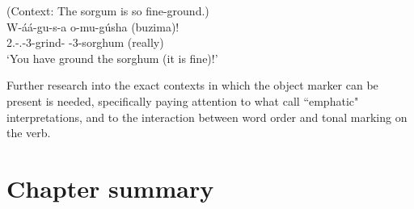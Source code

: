 \documentclass[output=paper]{langscibook}
\begin{document}
\z

\ea
\label{bkm:Ref114323509}
(Context: The sorgum is so fine-ground.)\\
\gll
W-áá-gu-s-a  o-mu-gúsha  (buzima)!\\
2\SG{}.\SM{}-\N{}.\PST{}-3\OM{}-{}grind-\FV{}  \AUG{}-{}3-sorghum  (really)\\
\glt
‘You have ground the sorghum (it is fine)!’\\


\z

Further research into the exact contexts in which the object marker can be present is needed, specifically paying attention to what \citet{LippardEtAlFut} call ``emphatic" interpretations, and to the interaction between word order and tonal marking on the verb.

\section{Chapter summary}\label{sec:summary}
\end{document}
